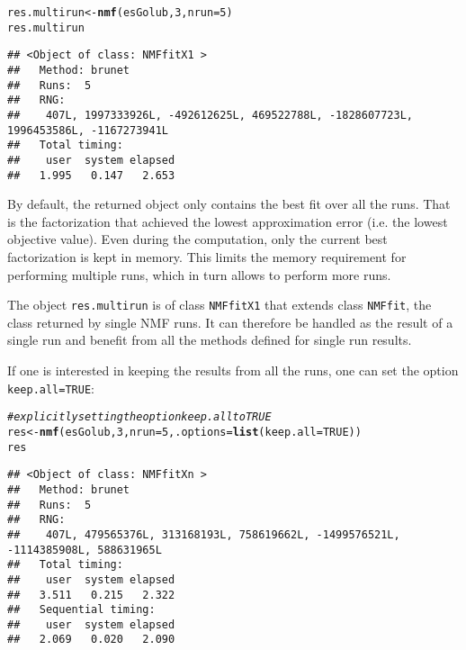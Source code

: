 \documentclass[a4paper]{article}\usepackage[]{graphicx}\usepackage[]{color}
\makeatletter
\newcommand{\hlnum}[1]{\textcolor[rgb]{0.686,0.059,0.569}{#1}}%
\newcommand{\hlcom}[1]{\textcolor[rgb]{0.678,0.584,0.686}{\textit{#1}}}%
\newcommand{\hlstd}[1]{\textcolor[rgb]{0.345,0.345,0.345}{#1}}%
\newcommand{\hlkwb}[1]{\textcolor[rgb]{0.69,0.353,0.396}{#1}}%
\newcommand{\hlkwc}[1]{\textcolor[rgb]{0.333,0.667,0.333}{#1}}%
\newcommand{\hlkwd}[1]{\textcolor[rgb]{0.737,0.353,0.396}{\textbf{#1}}}%
\newenvironment{kframe}{%
 \def\at@end@of@kframe{}%
 \ifinner\ifhmode%
  \def\at@end@of@kframe{\end{minipage}}%
  \begin{minipage}{\columnwidth}%
 \fi\fi%
 \def\FrameCommand##1{\hskip\@totalleftmargin \hskip-\fboxsep
 \colorbox{shadecolor}{##1}\hskip-\fboxsep
     \hskip-\linewidth \hskip-\@totalleftmargin \hskip\columnwidth}%
 \MakeFramed {\advance\hsize-\width
   \@totalleftmargin\z@ \linewidth\hsize
   \@setminipage}}%
 {\par\unskip\endMakeFramed%
 \at@end@of@kframe}
\newenvironment{knitrout}{}{} %
\let\code=\texttt
\makeatother
\begin{document}
\begin{knitrout}
\color{fgcolor}\begin{kframe}
\begin{alltt}
\hlstd{res.multirun} \hlkwb{<-} \hlkwd{nmf}\hlstd{(esGolub,} \hlnum{3}\hlstd{,} \hlkwc{nrun}\hlstd{=}\hlnum{5}\hlstd{)}
\hlstd{res.multirun}
\end{alltt}
\begin{verbatim}
## <Object of class: NMFfitX1 >
##   Method: brunet 
##   Runs:  5 
##   RNG:
##    407L, 1997333926L, -492612625L, 469522788L, -1828607723L, 1996453586L, -1167273941L 
##   Total timing:
##    user  system elapsed 
##   1.995   0.147   2.653
\end{verbatim}
\end{kframe}
\end{knitrout}

By default, the returned object only contains the best fit over all the runs.
That is the factorization that achieved the lowest approximation error (i.e. the lowest objective value).
Even during the computation, only the current best factorization is kept in memory.
This limits the memory requirement for performing multiple runs, which in turn allows to perform more runs.

The object \code{res.multirun} is of class \code{NMFfitX1} that extends class \code{NMFfit}, the class returned by single NMF runs. 
It can therefore be handled as the result of a single run and benefit from all the methods defined for single run results.

\medskip
If one is interested in keeping the results from all the runs, one can set the option \code{keep.all=TRUE}:

\begin{knitrout}
\color{fgcolor}\begin{kframe}
\begin{alltt}
\hlcom{# explicitly setting the option keep.all to TRUE}
\hlstd{res} \hlkwb{<-} \hlkwd{nmf}\hlstd{(esGolub,} \hlnum{3}\hlstd{,} \hlkwc{nrun}\hlstd{=}\hlnum{5}\hlstd{,} \hlkwc{.options}\hlstd{=}\hlkwd{list}\hlstd{(}\hlkwc{keep.all}\hlstd{=}\hlnum{TRUE}\hlstd{))}
\hlstd{res}
\end{alltt}
\begin{verbatim}
## <Object of class: NMFfitXn >
##   Method: brunet 
##   Runs:  5 
##   RNG:
##    407L, 479565376L, 313168193L, 758619662L, -1499576521L, -1114385908L, 588631965L 
##   Total timing:
##    user  system elapsed 
##   3.511   0.215   2.322 
##   Sequential timing:
##    user  system elapsed 
##   2.069   0.020   2.090
\end{verbatim}
\end{kframe}
\end{knitrout}
\end{document}
